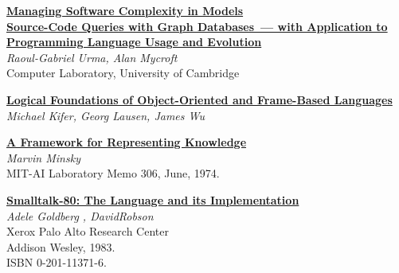 \begin{thebibliography}{99}

\href{https://insights.sei.cmu.edu/sei_blog/2015/09/managing-software-complexity-in-models.html}{\textbf{Managing
Software Complexity in Models}}\\

\href{https://www.repository.cam.ac.uk/bitstream/handle/1810/247929/Urma%20and%20Mycroft%202013%20Science%20of%20Computer%20Programming.pdf}{\textbf{Source-Code
Queries with Graph Databases\ --- with Application to Programming Language Usage and Evolution}}\\
\textit{Raoul-Gabriel Urma, Alan Mycroft}\\
Computer Laboratory, University of Cambridge

\href{http://www3.cs.stonybrook.edu/~kifer/TechReports/flogic.pdf}{\textbf{Logical
Foundations of Object-Oriented and Frame-Based Languages}}\\
\textit{Michael Kifer, Georg Lausen, James Wu}

\href{https://web.media.mit.edu/~minsky/papers/Frames/frames.html}{\textbf{A
Framework for Representing Knowledge}}\\
\textit{Marvin Minsky}\\
MIT-AI Laboratory Memo 306, June, 1974.

\href{http://stephane.ducasse.free.fr/FreeBooks/BlueBook/Bluebook.pdf}{\textbf{Smalltalk-80:
The Language and its Implementation}}\\
\textit{Adele Goldberg , DavidRobson}\\
Xerox Palo Alto Research Center\\
Addison Wesley, 1983.\\
ISBN 0-201-11371-6.\\

\end{thebibliography}
